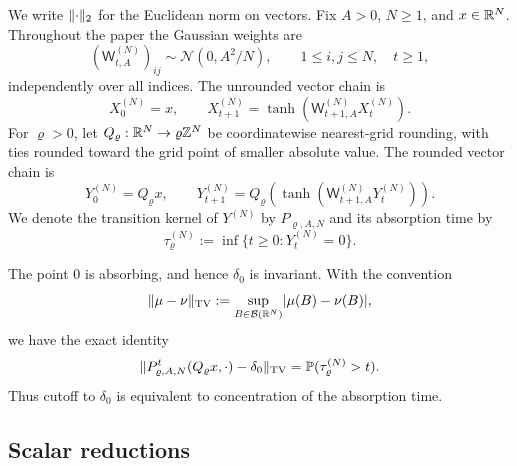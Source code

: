 \documentclass[11pt,reqno,a4paper]{article}
\newcommand{\Pp}{\P}
\newcommand{\TV}{\mathrm{TV}}
\begin{document}
We write $\lVert\cdot\rVert_2$ for the Euclidean norm on vectors. Fix $A>0$,
$N\geq1$, and $x\in\mathbb{R}^N$. Throughout the paper the Gaussian weights are
\begin{equation}\label{eq:gaussian-weights}
  (\mathsf W_{t,A}^{(N)})_{ij}
  \sim
  \mathcal N(0,A^2/N),
  \qquad
  1\leq i,j\leq N,\quad t\geq1,
\end{equation}
independently over all indices. The unrounded vector chain is
\begin{equation}\label{eq:unrounded-chain}
  X_0^{(N)}=x,
  \qquad
  X_{t+1}^{(N)}
  =
  \tanh\left(\mathsf W_{t+1,A}^{(N)}X_t^{(N)}\right).
\end{equation}
For $\varrho>0$, let $Q_\varrho:\mathbb{R}^N\to\varrho\mathbb{Z}^N$ be coordinatewise
nearest-grid rounding, with ties rounded toward the grid point of smaller
absolute value. The rounded vector chain is
\begin{equation}\label{eq:rounded-chain}
  Y_0^{(N)}=Q_\varrho x,
  \qquad
  Y_{t+1}^{(N)}
  =
  Q_\varrho\left(
    \tanh\left(\mathsf W_{t+1,A}^{(N)}Y_t^{(N)}\right)
  \right).
\end{equation}
We denote the transition kernel of $Y^{(N)}$ by $P_{\varrho,A,N}$ and its
absorption time by
\begin{equation}\label{eq:absorption-time}
  \tau_\varrho^{(N)}
  :=
  \inf\{t\geq0:Y_t^{(N)}=0\}.
\end{equation}

The point $0$ is absorbing, and hence $\delta_0$ is invariant. With the
convention
\begin{equation*}
  \norm{\mu-\nu}_{\TV}
  :=
  \sup_{B\in\mathcal B(\R^N)}\abs{\mu(B)-\nu(B)},
\end{equation*}
we have the exact identity
\begin{equation}\label{eq:tv-absorption}
  \norm{
    P_{\varrho,A,N}^t(Q_\varrho x,\cdot)-\delta_0
  }_{\TV}
  =
  \Pp(\tau_\varrho^{(N)}>t).
\end{equation}
Thus cutoff to $\delta_0$ is equivalent to concentration of the absorption
time.

\subsection{Scalar reductions}
\label{subsec:radius-observables}
\end{document}
